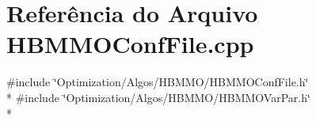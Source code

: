\section{Referência do Arquivo H\+B\+M\+M\+O\+Conf\+File.\+cpp}
\label{_h_b_m_m_o_conf_file_8cpp}
{\ttfamily \#include \char`\"{}Optimization/\+Algos/\+H\+B\+M\+M\+O/\+H\+B\+M\+M\+O\+Conf\+File.\+h\char`\"{}}\\*
{\ttfamily \#include \char`\"{}Optimization/\+Algos/\+H\+B\+M\+M\+O/\+H\+B\+M\+M\+O\+Var\+Par.\+h\char`\"{}}\\*
